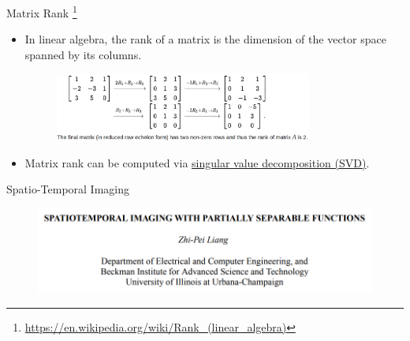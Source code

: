 \documentclass[aspectratio=169]{beamer}
\begin{document}
	\begin{frame}{Matrix Rank \footnote{\url{https://en.wikipedia.org/wiki/Rank_(linear_algebra)}}}
		\begin{itemize}
			\item <1-> In linear algebra, the rank of a matrix is the dimension of the vector space spanned by its columns.
			\begin{figure}
				\centering
				\includegraphics[width=0.8\textwidth]{figures/rank.png}
			\end{figure}

			\vspace{1em}
			\item <2-> Matrix rank can be computed via \underline{singular value decomposition (SVD)}.
		\end{itemize}		
	\end{frame}
	
	\begin{frame}{Spatio-Temporal Imaging}
		\begin{figure}
			\centering
			\includegraphics[width=\textwidth]{figures/psf1.png}
		\end{figure}
	\end{frame}
	
\end{document}
